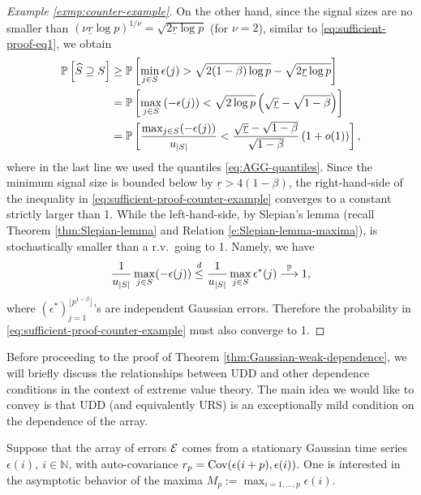 \begin{proof}[Example \ref{exmp:counter-example}]
On the other hand, since the signal sizes are no smaller than $(\nu\underline{r}\log p)^{1/\nu} = \sqrt{2\underline{r}\log p}$ (for $\nu = 2$), similar to 
\eqref{eq:sufficient-proof-eq1}, we obtain
\begin{align}
    \P\left[\widehat{S} \supseteq S\right] 
    &\ge \P\left[\min_{j\in S}\epsilon(j) > \sqrt{2(1-\beta)\log{p}} - \sqrt{2\underline{r}\log{p}} \right] \nonumber \\
    &= \P\left[\max_{j\in S}\left(-\epsilon(j)\right) < \sqrt{2\log{p}}\left(\sqrt{\underline{r}}-\sqrt{1-\beta}\right) \right] \nonumber \\
    &= \P\left[\frac{\max_{j\in S}(-\epsilon(j))}{u_{|S|}} < \frac{\sqrt{\underline{r}}-\sqrt{1-\beta}}{\sqrt{1-\beta}}\left(1+o(1)\right) \right], \label{eq:sufficient-proof-counter-example}
\end{align}
where in the last line we used the quantiles \eqref{eq:AGG-quantiles}.
Since the minimum signal size is bounded below by $\underline{r} > 4(1-\beta)$, the right-hand-side of the inequality in \eqref{eq:sufficient-proof-counter-example} converges to a constant strictly larger than 1. While the left-hand-side, by Slepian's lemma (recall 
Theorem \ref{thm:Slepian-lemma} and Relation \ref{e:Slepian-lemma-maxima}), is stochastically smaller than a r.v.\ going to 1.  Namely, we have
\begin{equation}
  \frac{1}{u_{|S|}} \max_{j\in S}(-\epsilon(j)) \stackrel{d}{\le} \frac{1}{u_{|S|}} \max_{j\in S} \epsilon^*(j) \stackrel{\P}{\longrightarrow} 1,
\end{equation}
where $\left({\epsilon^*}\right)_{j=1}^{\lfloor p^{1-\beta}\rfloor}$'s are independent Gaussian errors.
Therefore the probability in \eqref{eq:sufficient-proof-counter-example} must also converge to 1.
\end{proof}




\medskip

Before proceeding to the proof of Theorem \ref{thm:Gaussian-weak-dependence}, we will briefly discuss 
the relationships between UDD and other dependence conditions in the context of extreme value theory. The main idea
we would like to convey is that UDD (and equivalently URS) is an exceptionally mild condition on the dependence of the array.

\medskip
{} 
 \label{UDD_and_Berman}
 Suppose that the array of errors  ${\cal E}$ comes from a stationary Gaussian time series $\epsilon(i),\ i\in \mathbb{N}$, with auto-covariance $r_p=\cov(\epsilon(i+p),\epsilon(i))$. 
One is interested in the asymptotic behavior of the maxima $M_p:=\max_{i=1,\dots,p} \epsilon(i)$.

